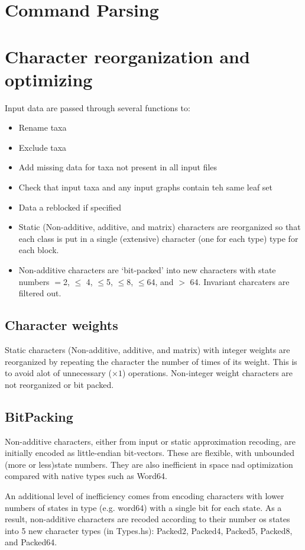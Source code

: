\documentclass[11pt]{article}
\begin{document}
	\section {Command Parsing}
	
	\section{Character reorganization and optimizing}
		Input data are passed through several functions to:
		\begin{itemize}
			\item{Rename taxa}
			\item{Exclude taxa}
			\item{Add missing data for taxa not present in all input files}
			\item{Check that input taxa and any input graphs contain teh same leaf set}
			\item{Data a reblocked if specified}
			\item{Static (Non-additive, additive, and matrix) characters are reorganized so that
				each class is put in a single (extensive) character (one for each type) type for each block.}
			\item{Non-additive characters are `bit-packed' into new characters with state numbers $=$2, $\leq$
				4, $\leq$5, $\leq$8, $\leq$64, and $>$ 64. Invariant charcaters are filtered out.}
			 
		\end{itemize}
		\subsection{Character weights}
		Static characters (Non-additive, additive, and matrix) with integer weights are reorganized
		by repeating the character the number of times of its weight.  This is to avoid alot of 
		unnecessary ($\times 1$) operations.  Non-integer weight characters are not reorganized or
		bit packed.
		
		\subsection{BitPacking}
		Non-additive characters, either from input or static approximation recoding, are initially 
		encoded as little-endian bit-vectors.  These are flexible, with unbounded (more or less)state numbers.
		They are also inefficient in space nad optimization compared with native types such as Word64. 
		
		An additional level of inefficiency comes from encoding characters with lower numbers of states in type (e.g. word64) with a single bit for each state.  As a result, non-additive characters are recoded according to their 
		number os states into 5 new character types (in Types.hs): Packed2, Packed4, Packed5, Packed8, and Packed64. 
		
\end{document}
